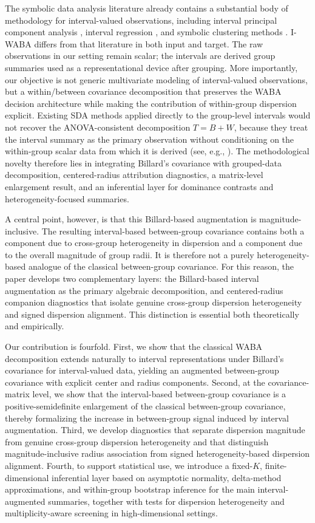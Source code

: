 \documentclass[preprint, times, 12pt, authoryear]{elsarticle}
\begin{document}
The symbolic data analysis literature already contains a substantial body of methodology for interval-valued observations, including interval principal component analysis \citep{Cazes1997,lauro2000}, interval regression \citep{lima2010constrained}, and symbolic clustering methods \citep{diday1988symbolic}. I-WABA differs from that literature in both input and target. The raw observations in our setting remain scalar; the intervals are derived group summaries used as a representational device after grouping. More importantly, our objective is not generic multivariate modeling of interval-valued observations, but a within/between covariance decomposition that preserves the WABA decision architecture while making the contribution of within-group dispersion explicit. Existing SDA methods applied directly to the group-level intervals would not recover the ANOVA-consistent decomposition \(T=B+W\), because they treat the interval summary as the primary observation without conditioning on the within-group scalar data from which it is derived (see, e.g., \citealp{Cazes1997,lauro2000}). The methodological novelty therefore lies in integrating Billard's covariance with grouped-data decomposition, centered-radius attribution diagnostics, a matrix-level enlargement result, and an inferential layer for dominance contrasts and heterogeneity-focused summaries.

A central point, however, is that this Billard-based augmentation is magnitude-inclusive. The resulting interval-based between-group covariance contains both a component due to cross-group heterogeneity in dispersion and a component due to the overall magnitude of group radii. It is therefore not a purely heterogeneity-based analogue of the classical between-group covariance. For this reason, the paper develops two complementary layers: the Billard-based interval augmentation as the primary algebraic decomposition, and centered-radius companion diagnostics that isolate genuine cross-group dispersion heterogeneity and signed dispersion alignment. This distinction is essential both theoretically and empirically.

Our contribution is fourfold. First, we show that the classical WABA decomposition extends naturally to interval representations under Billard's covariance for interval-valued data, yielding an augmented between-group covariance with explicit center and radius components. Second, at the covariance-matrix level, we show that the interval-based between-group covariance is a positive-semidefinite enlargement of the classical between-group covariance, thereby formalizing the increase in between-group signal induced by interval augmentation. Third, we develop diagnostics that separate dispersion magnitude from genuine cross-group dispersion heterogeneity and that distinguish magnitude-inclusive radius association from signed heterogeneity-based dispersion alignment. Fourth, to support statistical use, we introduce a fixed-\(K\), finite-dimensional inferential layer based on asymptotic normality, delta-method approximations, and within-group bootstrap inference for the main interval-augmented summaries, together with tests for dispersion heterogeneity and multiplicity-aware screening in high-dimensional settings.
\end{document}
